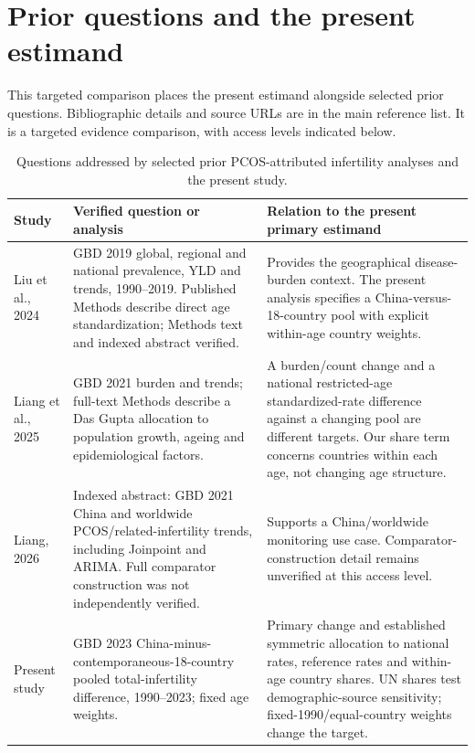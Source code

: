 \documentclass[11pt,a4paper]{article}
\begin{document}
\section*{Prior questions and the present estimand}
This targeted comparison places the present estimand alongside selected prior questions. Bibliographic details and source URLs are in the main reference list. It is a targeted evidence comparison, with access levels indicated below.
\small
\begin{longtable}{p{}p{}p{}}
\caption{Questions addressed by selected prior PCOS-attributed infertility analyses and the present study.}\\
\toprule Study & Verified question or analysis & Relation to the present primary estimand\\\midrule\endhead
Liu et al., 2024 & GBD 2019 global, regional and national prevalence, YLD and trends, 1990--2019. Published Methods describe direct age standardization; Methods text and indexed abstract verified. & Provides the geographical disease-burden context. The present analysis specifies a China-versus-18-country pool with explicit within-age country weights.\\
Liang et al., 2025 & GBD 2021 burden and trends; full-text Methods describe a Das Gupta allocation to population growth, ageing and epidemiological factors. & A burden/count change and a national restricted-age standardized-rate difference against a changing pool are different targets. Our share term concerns countries within each age, not changing age structure.\\
Liang, 2026 & Indexed abstract: GBD 2021 China and worldwide PCOS/related-infertility trends, including Joinpoint and ARIMA. Full comparator construction was not independently verified. & Supports a China/worldwide monitoring use case. Comparator-construction detail remains unverified at this access level.\\
Present study & GBD 2023 China-minus-contemporaneous-18-country pooled total-infertility difference, 1990--2023; fixed age weights. & Primary change and established symmetric allocation to national rates, reference rates and within-age country shares. UN shares test demographic-source sensitivity; fixed-1990/equal-country weights change the target.\\\bottomrule
\end{longtable}\normalsize


\clearpage
\end{document}
